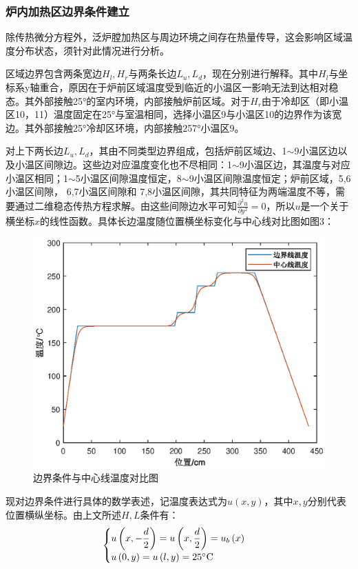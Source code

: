 \documentclass[a4paper,12pt]{ctexart} %
\begin{document}
	\subsubsection{炉内加热区边界条件建立}
	除传热微分方程外，泛炉膛加热区与周边环境之间存在热量传导，这会影响区域温度分布状态，须针对此情况进行分析。\par
	区域边界包含两条宽边$H_l,H_r$与两条长边$L_u,L_d$，现在分别进行解释。其中$H_l$与坐标系y轴重合，原因在于炉前区域温度受到临近的小温区一影响无法到达相对稳态。其外部接触25°的室内环境，内部接触炉前区域。对于$H_r$由于冷却区（即小温区10，11）温度固定在25°与室温相同，选择小温区9与小温区10的边界作为该宽边。其外部接触25°冷却区环境，内部接触257°小温区9。\par
	对上下两长边$L_u,L_d$，其由不同类型边界组成，包括炉前区域边、1$\sim$9小温区边以及小温区间隙边。这些边对应温度变化也不尽相同：1$\sim$9小温区边，其温度与对应小温区相同；1$\sim$5小温区间隙温度恒定，8$\sim$9小温区间隙温度恒定；炉前区域，5,6小温区间隙， 6,7小温区间隙和 7,8小温区间隙，其共同特征为两端温度不等，需要通过二维稳态传热方程求解。由这些间隙边水平可知$\frac{\partial^2 u}{\partial y^2}=0$，所以$u$是一个关于横坐标$x$的线性函数。具体长边温度随位置横坐标变化与中心线对比图如图3：
	\begin{figure}[H]
		\centering
		\includegraphics[scale=0.6]{Q1-edge}
		\caption{边界条件与中心线温度对比图}
	\end{figure}\par
	现对边界条件进行具体的数学表述，记温度表达式为$u\left(x,y\right)$，其中$x,y$分别代表位置横纵坐标。由上文所述$H,L$条件有：
	\begin{equation}
	\begin{cases}
	u\left(x,-\dfrac{d}{2}\right)=u\left(x,\dfrac{d}{2}\right)=u_b\left(x\right)\\
	u\left(0,y\right)=u\left(l,y\right)=25\degree\mathrm C\\
	\end{cases}
	\end{equation}
\end{document}
